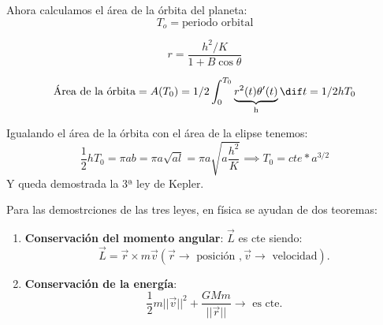Ahora calculamos el área de la órbita del planeta:
$$T_o = \text{periodo orbital}$$

$$r= \frac{h^2/K}{1 + B\cos\theta}$$

$$\text{Área de la órbita} = A(T_0) = 1/2 \int_0^{T_0} \underbrace{r^2(t)\theta'(t)}_{\text{h}}\dif t = 1/2hT_0$$

Igualando el área de la órbita con  el área de la elipse tenemos:
$$\frac{1}{2}hT_0 = \pi ab= \pi a \sqrt{al} = \pi a\sqrt{a\frac{h^2}{K}} \implies T_0 = cte*a^{3/2}$$
Y queda demostrada la 3ª ley de Kepler.

\obs Para las demostrciones de las tres leyes, en física se ayudan de dos teoremas:
\begin{enumerate}
\item\textbf{Conservación del momento angular}:
$\overrightarrow{L}$ es cte siendo:
\[\overrightarrow{L} = \overrightarrow{r} \times m \overrightarrow{v} (\overrightarrow{r} \rightarrow  \text{ posición },  \overrightarrow{v} \rightarrow \text{ velocidad}).\]


\item\textbf{Conservación de la energía}:\\
\[\frac{1}{2}m||\overrightarrow{v}||^2 + \frac{GMm}{||\overrightarrow{r}||} \rightarrow \text{ es cte}.\]
\end{enumerate}










